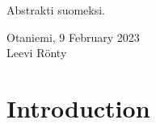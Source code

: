 \documentclass[english, 12pt, a4paper, sci, utf8, a-2b, online]{aaltothesis}
\date{9 February 2023}
\begin{document}
\makecoverpage
\makecopyrightpage
\clearpage

\begin{abstractpage}[english]
    \abstracttext{}
\end{abstractpage}


\newpage
{}
\date{9.2.2023}
\begin{abstractpage}[finnish]
    Abstrakti suomeksi.
\end{abstractpage}


\newpage


\dothesispagenumbering{}


\vspace{5cm}
Otaniemi, 9 February 2023\\

\vspace{5mm}
{\hfill Leevi Rönty \hspace{1cm}}

\newpage
\thesistableofcontents

\cleardoublepage
\section{Introduction}
\label{sec:intro}
\end{document}
